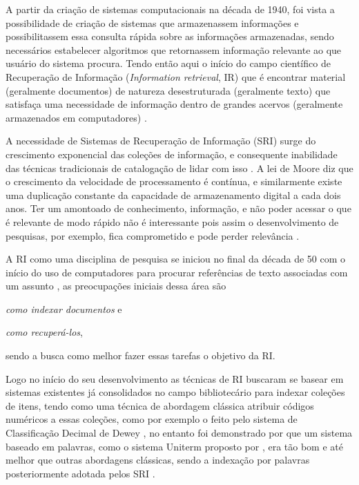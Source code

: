 
A partir da criação de sistemas computacionais na década de 1940, foi vista a possibilidade de criação de sistemas que armazenassem informações e possibilitassem essa consulta rápida sobre as informações armazenadas, sendo necessários estabelecer algoritmos que retornassem informação relevante ao que usuário do sistema procura. 
Tendo então aqui o início do campo científico de Recuperação de Informação (\textit{Information retrieval}, IR) que é encontrar material (geralmente documentos) de natureza desestruturada (geralmente texto) que satisfaça uma necessidade de informação dentro de grandes acervos (geralmente armazenados em computadores) \cite[p.~1]{Manning2008IIR}.

A necessidade de Sistemas de Recuperação de Informação (SRI) surge do crescimento exponencial das coleções de informação, e consequente inabilidade das técnicas tradicionais de catalogação de lidar com isso \cite{Sanderson2012THIRR}. 
A lei de Moore diz que o crescimento da velocidade de processamento é contínua, e similarmente existe uma duplicação constante da capacidade de armazenamento digital a cada dois anos. 
Ter um amontoado de conhecimento, informação, e não poder acessar o que é relevante de modo rápido não é interessante pois assim o desenvolvimento de pesquisas, por exemplo, fica comprometido e pode perder relevância \cite{Bush:1979:WMT:1113634.1113638}.

A RI como uma disciplina de pesquisa se iniciou no final da década de 50 com o início do uso de computadores para procurar referências de texto associadas com um assunto \cite[p.~3]{Sanderson2012THIRR}, as preocupações iniciais dessa área são 
\begin{enumerate*}[label=(\alph*)]
\item \textit{como indexar documentos} e \item \textit{como recuperá-los},
\end{enumerate*}
sendo a busca como melhor fazer essas tarefas o objetivo da RI.

Logo no início do seu desenvolvimento as técnicas de RI buscaram se basear em sistemas existentes já consolidados no campo bibliotecário para indexar coleções de itens, tendo como uma técnica de abordagem clássica atribuir códigos numéricos a essas coleções, como por exemplo o feito pelo sistema de Classificação Decimal de Dewey \cite[p.~1446]{Sanderson2012THIRR}, no entanto foi demonstrado por  que um sistema baseado em palavras, como o sistema Uniterm proposto por , era tão bom e até melhor que outras abordagens clássicas, sendo a indexação por palavras posteriormente adotada pelos SRI \cite[p.~1446]{Sanderson2012THIRR}.

